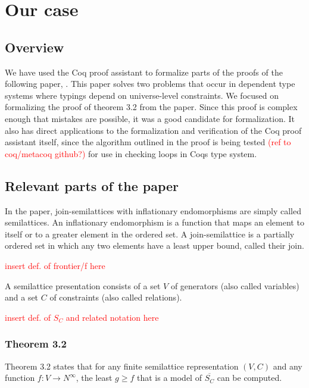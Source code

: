 \chapter{Our case}

\section{Overview}

We have used the Coq proof assistant to formalize parts of the proofs of the following paper, \citeauthor{mbezem} \cite{mbezem}.
This paper solves two problems that occur in dependent type systems where typings depend
on universe-level constraints. We focused on formalizing the proof of theorem 3.2 from the paper.
Since this proof is complex enough that mistakes are possible, it was a good candidate for formalization.
It also has direct applications to the formalization and verification of the Coq proof assistant itself,
since the algorithm outlined in the proof is being tested \textcolor{red}{(ref to coq/metacoq github?)}
for use in checking loops in Coqs type system.

\section{Relevant parts of the paper}

In the paper, join-semilattices with inflationary endomorphisms
are simply called semilattices. An inflationary endomorphism is a function
that maps an element to itself or to a greater element in the ordered set.
A join-semilattice is a partially ordered set in which any two elements have a least upper bound,
called their join.

\textcolor{red}{insert def. of frontier/f here}

A semilattice presentation consists of a set $V$ of generators
(also called variables) and a set  $C$ of constraints
(also called relations).

\textcolor{red}{insert def. of $S_C$ and related notation here}


\subsection{Theorem 3.2}

Theorem 3.2 states that for any finite semilattice representation
$(V, C)$ and any function $f : V \rightarrow N^{\infty}$,
the least $g \ge f$ that is a model of $\overline{S_C}$ can be computed.

